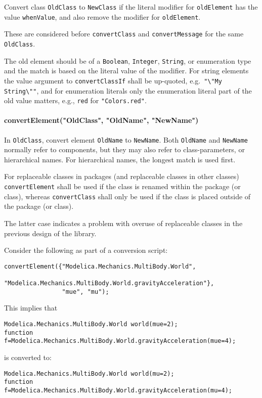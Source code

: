 Convert class \lstinline!OldClass! to \lstinline!NewClass! if the literal modifier for
\lstinline!oldElement! has the value \lstinline!whenValue!, and also remove the modifier for
\lstinline!oldElement!.

These are considered before \lstinline!convertClass! and \lstinline!convertMessage! for the same \lstinline!OldClass!.

The old element should be of a \lstinline!Boolean!, \lstinline!Integer!, \lstinline!String!, or enumeration
type and the match is based on the literal value of the modifier.
For string elements the value argument to \lstinline!convertClassIf! shall be up-quoted, e.g.\ \lstinline!"\"My String\""!,
and for enumeration literals only the enumeration literal part of the old value matters, e.g., \lstinline!red!
for \lstinline!"Colors.red"!.

\paragraph*{convertElement("OldClass", "OldName", "NewName")}\label{convertelementoldclassoldnamenewname}

In \lstinline!OldClass!, convert element \lstinline!OldName! to \lstinline!NewName!.  Both \lstinline!OldName! and \lstinline!NewName! normally refer to components, but they may also refer to
class-parameters, or hierarchical names.  For hierarchical names, the longest match is used first.

For replaceable classes in packages (and replaceable classes in other classes) \lstinline!convertElement! shall
be used if the class is renamed within the package (or class), whereas \lstinline!convertClass! shall only be used if the class
is placed outside of the package (or class).

\begin{nonnormative}
The latter case indicates a problem with overuse of replaceable classes in the previous design of the library.
\end{nonnormative}

\begin{example}
Consider the following as part of a conversion script:
\begin{lstlisting}[language=modelica]
convertElement({"Modelica.Mechanics.MultiBody.World",
                "Modelica.Mechanics.MultiBody.World.gravityAcceleration"},
                "mue", "mu");
\end{lstlisting}
This implies that
\begin{lstlisting}[language=modelica]
Modelica.Mechanics.MultiBody.World world(mue=2);
function f=Modelica.Mechanics.MultiBody.World.gravityAcceleration(mue=4);
\end{lstlisting}
is converted to:
\begin{lstlisting}[language=modelica]
Modelica.Mechanics.MultiBody.World world(mu=2);
function f=Modelica.Mechanics.MultiBody.World.gravityAcceleration(mu=4);
\end{lstlisting}
\end{example}

